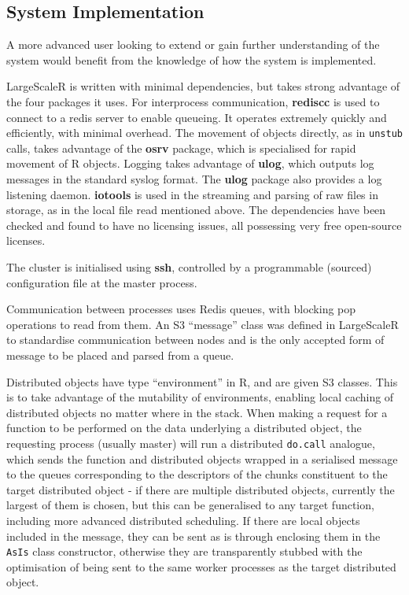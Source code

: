 \subsection{System Implementation}\label{sec:sys-imp}

A more advanced user looking to extend or gain further understanding of the system would benefit from the knowledge of how the system is implemented.

LargeScaleR is written with minimal dependencies, but takes strong advantage of the four packages it uses.
For interprocess communication, \textbf{rediscc} is used to connect to a redis server to enable queueing.
It operates extremely quickly and efficiently, with minimal overhead.
The movement of objects directly, as in \texttt{unstub} calls, takes advantage of the \textbf{osrv} package, which is specialised for rapid movement of R objects.
Logging takes advantage of \textbf{ulog}, which outputs log messages in the standard syslog format.
The \textbf{ulog} package also provides a log listening daemon.
\textbf{iotools} is used in the streaming and parsing of raw files in storage, as in the local file read mentioned above.
The dependencies have been checked and found to have no licensing issues, all possessing very free open-source licenses.

The cluster is initialised using \textbf{ssh}, controlled by a programmable (sourced) configuration file at the master process.

Communication between processes uses Redis queues, with blocking pop operations to read from them.
An S3 ``message'' class was defined in LargeScaleR to standardise communication between nodes and is the only accepted form of message to be placed and parsed from a queue.

Distributed objects have type ``environment'' in R, and are given S3 classes.
This is to take advantage of the mutability of environments, enabling local caching of distributed objects no matter where in the stack.
When making a request for a function to be performed on the data underlying a distributed object, the requesting process (usually master) will run a distributed \texttt{do.call} analogue, which sends the function and distributed objects wrapped in a serialised message to the queues corresponding to the descriptors of the chunks constituent to the target distributed object - if there are multiple distributed objects, currently the largest of them is chosen, but this can be generalised to any target function, including more advanced distributed scheduling.
If there are local objects included in the message, they can be sent as is through enclosing them in the \texttt{AsIs} class constructor, otherwise they are transparently stubbed with the optimisation of being sent to the same worker processes as the target distributed object.

